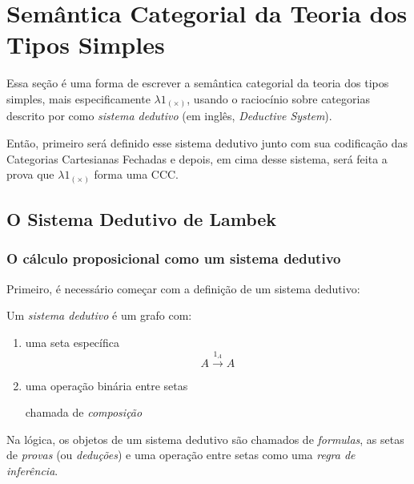 \documentclass[../main.tex]{subfiles}
\begin{document}
\section{Semântica Categorial da Teoria dos Tipos Simples}

Essa seção é uma forma de escrever a semântica categorial da teoria dos tipos simples, mais especificamente $\lambda1_{(\times)}$, usando o raciocínio sobre categorias descrito por \cite{lambek1988} como \emph{sistema dedutivo} (em inglês, \emph{Deductive System}).

Então, primeiro será definido esse sistema dedutivo junto com sua codificação das Categorias Cartesianas Fechadas e depois, em cima desse sistema, será feita a prova que $\lambda1_{(\times)}$ forma uma CCC.

\subsection{O Sistema Dedutivo de Lambek}

\subsubsection{O cálculo proposicional como um sistema dedutivo}

Primeiro, é necessário começar com a definição de um sistema dedutivo:

\begin{definition}
    Um \emph{sistema dedutivo} é um grafo com:

    \begin{enumerate}[label=(R1\alph*)]
        \item uma seta específica
    $$A \xrightarrow{1_A} A$$
        \item uma operação binária entre setas
        \begin{prooftree}
            
        \end{prooftree}
        chamada de \emph{composição}
    \end{enumerate}
\end{definition}

Na lógica, os objetos de um sistema dedutivo são chamados de \emph{formulas}, as setas de \emph{provas} (ou \emph{deduções}) e uma operação entre setas como uma \emph{regra de inferência}.
\end{document}
